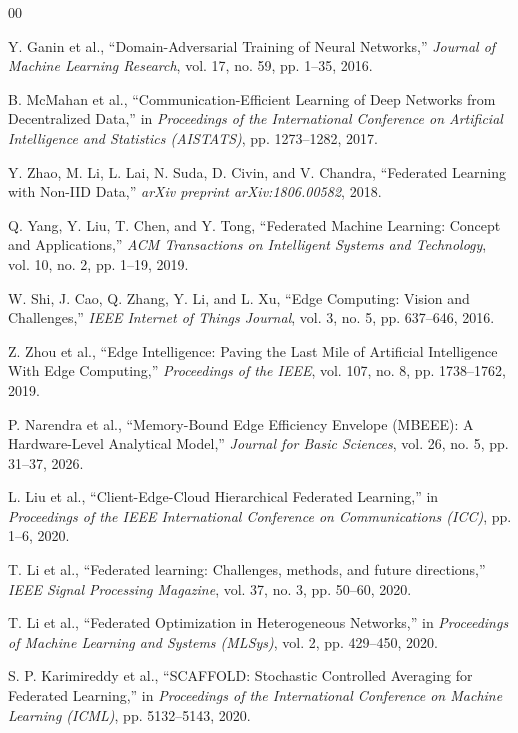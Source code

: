 \documentclass[conference]{IEEEtran}
\begin{document}
\begin{thebibliography}{00}

 Y. Ganin et al., ``Domain-Adversarial Training of Neural Networks,'' \textit{Journal of Machine Learning Research}, vol. 17, no. 59, pp. 1--35, 2016.

 B. McMahan et al., ``Communication-Efficient Learning of Deep Networks from Decentralized Data,'' in \textit{Proceedings of the International Conference on Artificial Intelligence and Statistics (AISTATS)}, pp. 1273--1282, 2017.

 Y. Zhao, M. Li, L. Lai, N. Suda, D. Civin, and V. Chandra, ``Federated Learning with Non-IID Data,'' \textit{arXiv preprint arXiv:1806.00582}, 2018.

 Q. Yang, Y. Liu, T. Chen, and Y. Tong, ``Federated Machine Learning: Concept and Applications,'' \textit{ACM Transactions on Intelligent Systems and Technology}, vol. 10, no. 2, pp. 1--19, 2019.

 W. Shi, J. Cao, Q. Zhang, Y. Li, and L. Xu, ``Edge Computing: Vision and Challenges,'' \textit{IEEE Internet of Things Journal}, vol. 3, no. 5, pp. 637--646, 2016.

 Z. Zhou et al., ``Edge Intelligence: Paving the Last Mile of Artificial Intelligence With Edge Computing,'' \textit{Proceedings of the IEEE}, vol. 107, no. 8, pp. 1738--1762, 2019.

 P. Narendra et al., ``Memory-Bound Edge Efficiency Envelope (MBEEE): A Hardware-Level Analytical Model,'' \textit{Journal for Basic Sciences}, vol. 26, no. 5, pp. 31--37, 2026.

 L. Liu et al., ``Client-Edge-Cloud Hierarchical Federated Learning,'' in \textit{Proceedings of the IEEE International Conference on Communications (ICC)}, pp. 1--6, 2020.

 T. Li et al., ``Federated learning: Challenges, methods, and future directions,'' \textit{IEEE Signal Processing Magazine}, vol. 37, no. 3, pp. 50--60, 2020.

 T. Li et al., ``Federated Optimization in Heterogeneous Networks,'' in \textit{Proceedings of Machine Learning and Systems (MLSys)}, vol. 2, pp. 429--450, 2020.

 S. P. Karimireddy et al., ``SCAFFOLD: Stochastic Controlled Averaging for Federated Learning,'' in \textit{Proceedings of the International Conference on Machine Learning (ICML)}, pp. 5132--5143, 2020.


\end{thebibliography}
\end{document}

